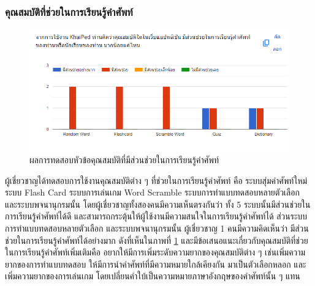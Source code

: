 \documentclass[12pt,oneside,openright,a4paper]{cpe-thai-project}
\begin{document}
\subsubsection{คุณสมบัติที่ช่วยในการเรียนรู้คำศัพท์}
\hspace{1cm}
\begin{figure}[!h]\centering
	\includegraphics[width=\textwidth, keepaspectratio=true]{image/appendix/2nd/feature.png}
	\caption{{ผลการทดสอบหัวข้อคุณสมบัติที่มีส่วนช่วยในการเรียนรู้คำศัพท์}}\label{fig:apdx2ndFeature1}
\end{figure} 
ผู้เชี่ยวชาญได้ทดสอบการใช้งานคุณสมบัติต่าง ๆ ที่ช่วยในการเรียนรู้คำศัพท์ คือ ระบบสุ่มคำศัพท์ใหม่ ระบบ Flash Card ระบบการเล่นเกม Word Scramble
ระบบการทำแบบทดสอบหลายตัวเลือก และระบบพจนานุกรมนั้น โดยผู้เชี่ยวชาญทั้งสองคนมีความเห็นตรงกันว่า
ทั้ง 5 ระบบนั้นมีส่วนช่วยในการเรียนรู้คำศัพท์ได้ดี และสามารถกระตุ้นให้ผู้ใช้งานมีความสนใจในการเรียนรู้คำศัพท์ได้ 
ส่วนระบบการทำแบบทดสอบหลายตัวเลือก และระบบพจนานุกรมนั้น ผู้เชี่ยวชาญ 1 คนมีความคิดเห็นว่า
มีส่วนช่วยในการเรียนรู้คำศัพท์ได้อย่างมาก ดังที่เห็นในภาพที่ \ref{fig:apdx2ndFeature1} และมีข้อเสนอแนะเกี่ยวกับคุณสมบัติที่ช่วยในการเรียนรู้คำศัพท์เพิ่มเติมคือ
อยากให้มีการเพิ่มระดับความยากของคุณสมบัติต่าง ๆ เช่นเพิ่มความยากของการทำแบบทดสอบ ให้มีการนำคำศัพท์ที่มีความหมายใกล้เคียงกัน
มาเป็นตัวเลือกหลอก และเพิ่มความยากของการเล่นเกม โดยเปลี่ยนคำใบ้เป็นความหมายภาษาอังกฤษของคำศัพท์นั้น ๆ แทน

\pagebreak
\end{document}
